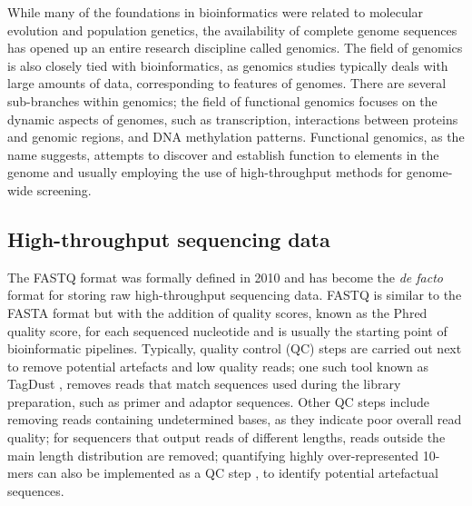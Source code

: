 While many of the foundations in bioinformatics were related to molecular evolution and population genetics, the availability of complete genome sequences has opened up an entire research discipline called genomics. The field of genomics is also closely tied with bioinformatics, as genomics studies typically deals with large amounts of data, corresponding to features of genomes. There are several sub-branches within genomics; the field of functional genomics focuses on the dynamic aspects of genomes, such as transcription, interactions between proteins and genomic regions, and DNA methylation patterns. Functional genomics, as the name suggests, attempts to discover and establish function to elements in the genome and usually employing the use of high-throughput methods for genome-wide screening.

\subsection{High-throughput sequencing data}

The FASTQ format was formally defined in 2010 \citep{pmid20015970} and has become the \textit{de facto} format for storing raw high-throughput sequencing data. FASTQ is similar to the FASTA format but with the addition of quality scores, known as the Phred quality score, for each sequenced nucleotide and is usually the starting point of bioinformatic pipelines. Typically, quality control (QC) steps are carried out next to remove potential artefacts and low quality reads; one such tool known as TagDust \citep{pmid19737799}, removes reads that match sequences used during the library preparation, such as primer and adaptor sequences. Other QC steps include removing reads containing undetermined bases, as they indicate poor overall read quality; for sequencers that output reads of different lengths, reads outside the main length distribution are removed; quantifying highly over-represented 10-mers can also be implemented as a QC step \citep{pmid21088025}, to identify potential artefactual sequences.

